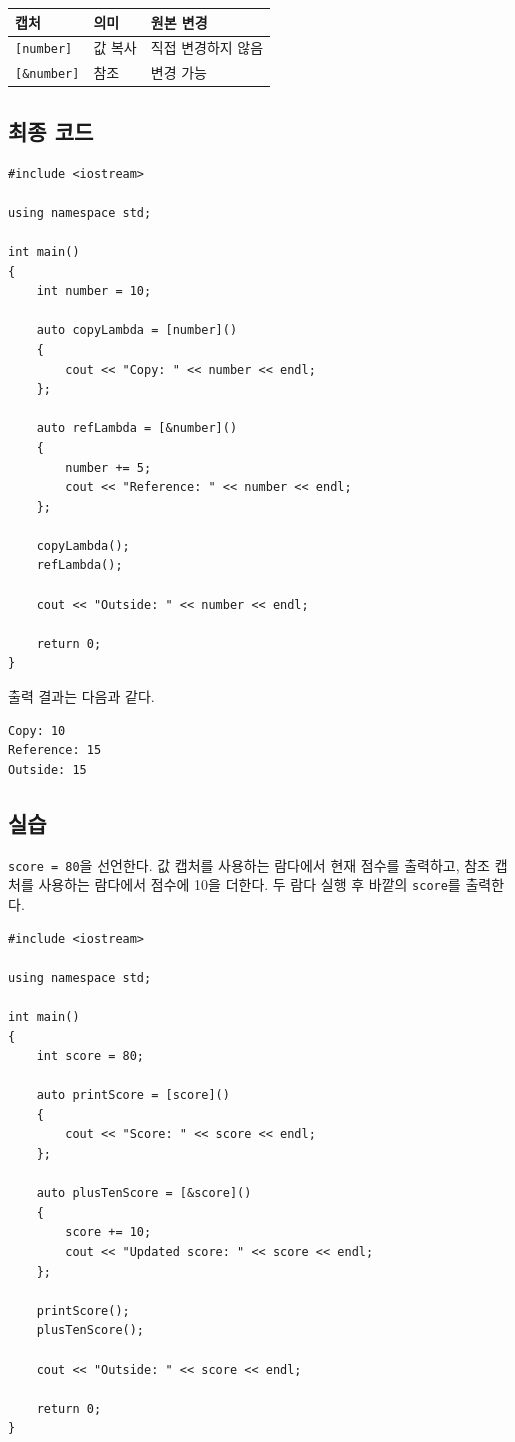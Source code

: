\documentclass[11pt,a4paper]{article}
\begin{document}
\begin{center}
\begin{tabular}{lll}
\toprule
캡처 & 의미 & 원본 변경 \\
\midrule
\texttt{[number]} & 값 복사 & 직접 변경하지 않음 \\
\texttt{[\&number]} & 참조 & 변경 가능 \\
\bottomrule
\end{tabular}
\end{center}

\subsection{최종 코드}
\begin{lstlisting}
#include <iostream>

using namespace std;

int main()
{
    int number = 10;

    auto copyLambda = [number]()
    {
        cout << "Copy: " << number << endl;
    };

    auto refLambda = [&number]()
    {
        number += 5;
        cout << "Reference: " << number << endl;
    };

    copyLambda();
    refLambda();

    cout << "Outside: " << number << endl;

    return 0;
}
\end{lstlisting}

출력 결과는 다음과 같다.

\begin{verbatim}
Copy: 10
Reference: 15
Outside: 15
\end{verbatim}

\subsection{실습}
\begin{practicebox}
\texttt{score = 80}을 선언한다.
값 캡처를 사용하는 람다에서 현재 점수를 출력하고,
참조 캡처를 사용하는 람다에서 점수에 10을 더한다.
두 람다 실행 후 바깥의 \texttt{score}를 출력한다.
\end{practicebox}

\begin{lstlisting}
#include <iostream>

using namespace std;

int main()
{
    int score = 80;

    auto printScore = [score]()
    {
        cout << "Score: " << score << endl;
    };

    auto plusTenScore = [&score]()
    {
        score += 10;
        cout << "Updated score: " << score << endl;
    };

    printScore();
    plusTenScore();

    cout << "Outside: " << score << endl;

    return 0;
}
\end{lstlisting}
\end{document}
